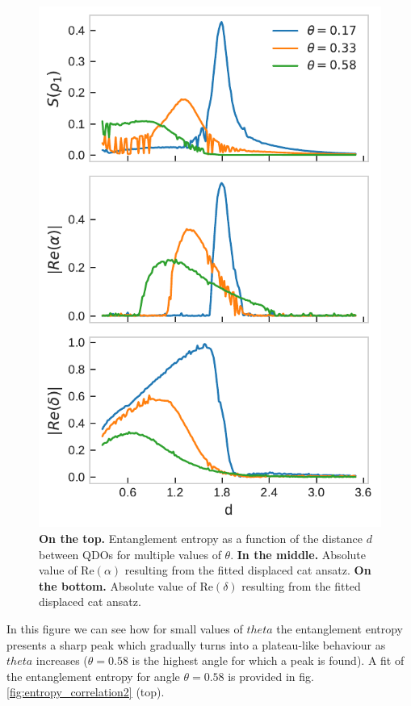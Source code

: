 \documentclass[reprint, amsmath, amssymb, floatfix, aps, pra]{revtex4-2}
\begin{document}
    \begin{figure}[h]
        \hspace{-0.4cm}
        \centering
        \includegraphics[scale=0.9]{figures/alpha_delta_rho.pdf}
        \caption{\label{fig:entropy_correlation}\textbf{On the top.} Entanglement entropy as a function of the distance $d$ between QDOs for multiple values of $\theta$. \textbf{In the middle.} Absolute value of $\mathrm{Re}\left(\alpha\right)$ resulting from the fitted displaced cat ansatz. \textbf{On the bottom.} Absolute value of $\mathrm{Re}\left(\delta\right)$ resulting from the fitted displaced cat ansatz.}
    \end{figure}
    In this figure we can see how for small values of $theta$ the entanglement entropy presents a sharp peak which gradually turns into a plateau-like behaviour as $theta$ increases ($\theta = 0.58$ is the highest angle for which a peak is found). A fit of the entanglement entropy for angle $\theta = 0.58$ is provided in fig. \ref{fig:entropy_correlation2} (top).
\end{document}
